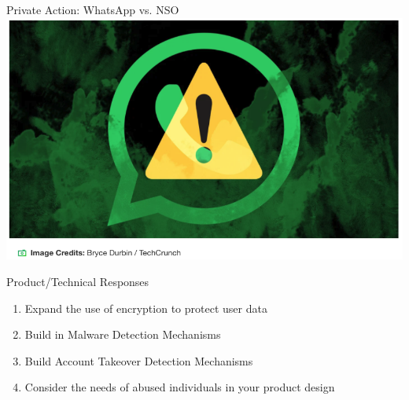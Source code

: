 \documentclass[nobackground,dvipsnames,table,aspectratio=169]{beamer}
\begin{document}
\begin{frame}{Private Action: WhatsApp vs. NSO}
    \centering
    \includegraphics[height=0.8\textheight]{nso-whatsapp}
\end{frame}

\begin{frame}{Product/Technical Responses}
    \large
    \begin{enumerate}
        \item Expand the use of encryption to protect user data
        \item Build in Malware Detection Mechanisms
        \item Build Account Takeover Detection Mechanisms
        \item Consider the needs of abused individuals in your product design
    \end{enumerate}
\end{frame}
\end{document}
